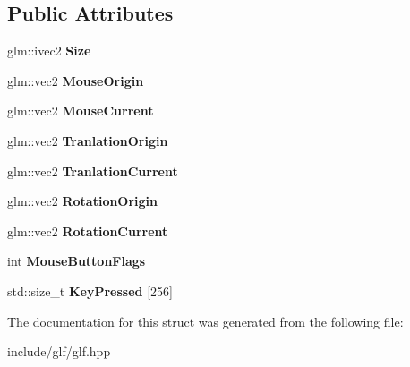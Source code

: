 \subsection*{\-Public \-Attributes}
\begin{DoxyCompactItemize}
\item 
\hypertarget{structglf_1_1window_a3ccf3073c5ee3ad7898a3df5e38e9e3c}{glm\-::ivec2 {\bfseries \-Size}}\label{structglf_1_1window_a3ccf3073c5ee3ad7898a3df5e38e9e3c}

\item 
\hypertarget{structglf_1_1window_af3e812025769b6fd906218f738c9830b}{glm\-::vec2 {\bfseries \-Mouse\-Origin}}\label{structglf_1_1window_af3e812025769b6fd906218f738c9830b}

\item 
\hypertarget{structglf_1_1window_a9c8c360ae5c63b5a497af107cc9bc26d}{glm\-::vec2 {\bfseries \-Mouse\-Current}}\label{structglf_1_1window_a9c8c360ae5c63b5a497af107cc9bc26d}

\item 
\hypertarget{structglf_1_1window_ac70f5217e610eac03bcf3520a7967684}{glm\-::vec2 {\bfseries \-Tranlation\-Origin}}\label{structglf_1_1window_ac70f5217e610eac03bcf3520a7967684}

\item 
\hypertarget{structglf_1_1window_a36a4ed3b03f6f6a763a9aad5144395a9}{glm\-::vec2 {\bfseries \-Tranlation\-Current}}\label{structglf_1_1window_a36a4ed3b03f6f6a763a9aad5144395a9}

\item 
\hypertarget{structglf_1_1window_ab463ee2990a13091537839b9f27e5eb6}{glm\-::vec2 {\bfseries \-Rotation\-Origin}}\label{structglf_1_1window_ab463ee2990a13091537839b9f27e5eb6}

\item 
\hypertarget{structglf_1_1window_adbb0959aec4c8d87fd0c6cfa5f448c1c}{glm\-::vec2 {\bfseries \-Rotation\-Current}}\label{structglf_1_1window_adbb0959aec4c8d87fd0c6cfa5f448c1c}

\item 
\hypertarget{structglf_1_1window_a65ff6fd7005591df0281d714eae5a8b9}{int {\bfseries \-Mouse\-Button\-Flags}}\label{structglf_1_1window_a65ff6fd7005591df0281d714eae5a8b9}

\item 
\hypertarget{structglf_1_1window_a34c61f5ba8070359924713e45f80396f}{std\-::size\-\_\-t {\bfseries \-Key\-Pressed} \mbox{[}256\mbox{]}}\label{structglf_1_1window_a34c61f5ba8070359924713e45f80396f}

\end{DoxyCompactItemize}


\-The documentation for this struct was generated from the following file\-:\begin{DoxyCompactItemize}
\item 
include/glf/glf.\-hpp\end{DoxyCompactItemize}
